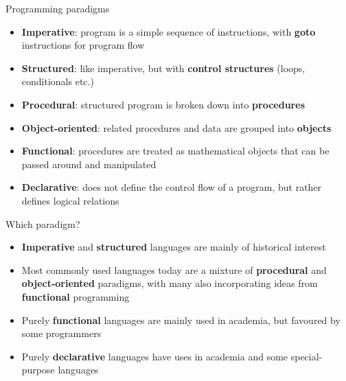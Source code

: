 \begin{frame}{Programming paradigms}
	\begin{itemize}
		\pause\item \textbf{Imperative}: program is a simple sequence of instructions,
			with \textbf{goto} instructions for program flow
		\pause\item \textbf{Structured}: like imperative, but with \textbf{control structures}
			(loops, conditionals etc.)
		\pause\item \textbf{Procedural}: structured program is broken down into
			\textbf{procedures}
		\pause\item \textbf{Object-oriented}: related procedures and data are grouped into
			\textbf{objects}
		\pause\item \textbf{Functional}: procedures are treated as mathematical objects that
			can be passed around and manipulated
		\pause\item \textbf{Declarative}: does not define the control flow of a program,
			but rather defines logical relations
	\end{itemize}
\end{frame}

\begin{frame}{Which paradigm?}
	\begin{itemize}
		\pause\item \textbf{Imperative} and \textbf{structured} languages are mainly of
			historical interest
		\pause\item Most commonly used languages today are a mixture of \textbf{procedural}
			and \textbf{object-oriented} paradigms, with many also incorporating
			ideas from \textbf{functional} programming
		\pause\item Purely \textbf{functional} languages are mainly used in academia,
			but favoured by some programmers
		\pause\item Purely \textbf{declarative} languages have uses in academia and some special-purpose languages
	\end{itemize}
\end{frame}

